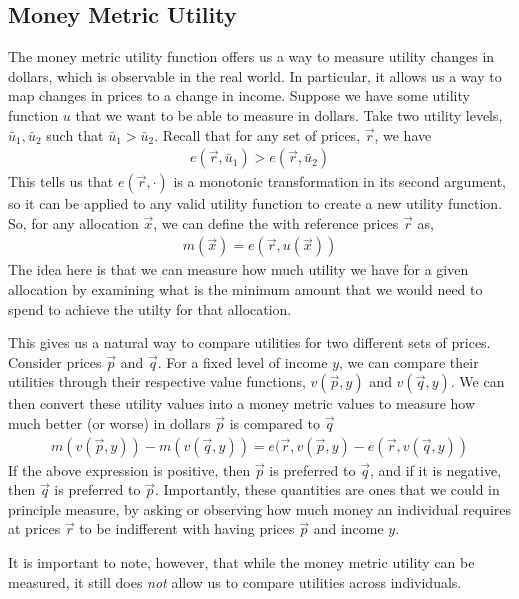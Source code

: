 \subsection*{Money Metric Utility}
The money metric utility function offers us a way to measure utility changes in dollars, which is observable in the real world. In particular, it allows us a way to map changes in prices to a change in income. Suppose we have some utility function $u$ that we want to be able to measure in dollars. Take two utility levels, $\bar{u}_1, \bar{u}_2$ such that $\bar{u}_1 > \bar{u}_2$. Recall that for any set of prices, $\vec{r}$, we have
\begin{align*}
    e(\vec{r}, \bar{u}_1) > e(\vec{r}, \bar{u}_2)
\end{align*}
This tells us that $e(\vec{r}, \cdot)$ is a monotonic transformation in its second argument, so it can be applied to any valid utility function to create a new utility function. So, for any allocation $\vec{x}$, we can define the  with reference prices $\vec{r}$ as,
\begin{align*}
    m(\vec{x}) = e(\vec{r}, u(\vec{x}))
\end{align*}
The idea here is that we can measure how much utility we have for a given allocation by examining what is the minimum amount that we would need to spend to achieve the utilty for that allocation. 

This gives us a natural way to compare utilities for two different sets of prices. Consider prices $\vec{p}$ and $\vec{q}$. For a fixed level of income $y$, we can compare their utilities through their respective value functions, $v(\vec{p}, y)$ and $v(\vec{q}, y)$. We can then convert these utility values into a money metric values to measure how much better (or worse) in dollars $\vec{p}$ is compared to $\vec{q}$
\begin{align*}
    m(v(\vec{p}, y)) - m(v(\vec{q}, y)) = e(\vec{r}, v(\vec{p}, y) - e(\vec{r}, v(\vec{q}, y))
\end{align*}
If the above expression is positive, then $\vec{p}$ is preferred to $\vec{q}$, and if it is negative, then $\vec{q}$ is preferred to $\vec{p}$. Importantly, these quantities are ones that we could in principle measure, by asking or observing how much money an individual requires at prices $\vec{r}$ to be indifferent with having prices $\vec{p}$ and income $y$. 

It is important to note, however, that while the money metric utility can be measured, it still does \emph{not} allow us to compare utilities across individuals.

